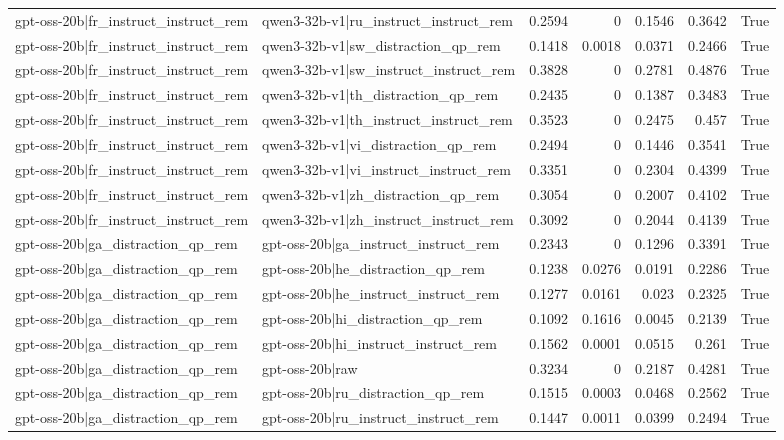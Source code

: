 \begin{table}
\begin{tabular}{l l r r r r l}
gpt-oss-20b|fr_instruct_instruct_rem & qwen3-32b-v1|ru_instruct_instruct_rem & 0.2594 & 0 & 0.1546 & 0.3642 & True \\
gpt-oss-20b|fr_instruct_instruct_rem & qwen3-32b-v1|sw_distraction_qp_rem & 0.1418 & 0.0018 & 0.0371 & 0.2466 & True \\
gpt-oss-20b|fr_instruct_instruct_rem & qwen3-32b-v1|sw_instruct_instruct_rem & 0.3828 & 0 & 0.2781 & 0.4876 & True \\
gpt-oss-20b|fr_instruct_instruct_rem & qwen3-32b-v1|th_distraction_qp_rem & 0.2435 & 0 & 0.1387 & 0.3483 & True \\
gpt-oss-20b|fr_instruct_instruct_rem & qwen3-32b-v1|th_instruct_instruct_rem & 0.3523 & 0 & 0.2475 & 0.457 & True \\
gpt-oss-20b|fr_instruct_instruct_rem & qwen3-32b-v1|vi_distraction_qp_rem & 0.2494 & 0 & 0.1446 & 0.3541 & True \\
gpt-oss-20b|fr_instruct_instruct_rem & qwen3-32b-v1|vi_instruct_instruct_rem & 0.3351 & 0 & 0.2304 & 0.4399 & True \\
gpt-oss-20b|fr_instruct_instruct_rem & qwen3-32b-v1|zh_distraction_qp_rem & 0.3054 & 0 & 0.2007 & 0.4102 & True \\
gpt-oss-20b|fr_instruct_instruct_rem & qwen3-32b-v1|zh_instruct_instruct_rem & 0.3092 & 0 & 0.2044 & 0.4139 & True \\
gpt-oss-20b|ga_distraction_qp_rem & gpt-oss-20b|ga_instruct_instruct_rem & 0.2343 & 0 & 0.1296 & 0.3391 & True \\
gpt-oss-20b|ga_distraction_qp_rem & gpt-oss-20b|he_distraction_qp_rem & 0.1238 & 0.0276 & 0.0191 & 0.2286 & True \\
gpt-oss-20b|ga_distraction_qp_rem & gpt-oss-20b|he_instruct_instruct_rem & 0.1277 & 0.0161 & 0.023 & 0.2325 & True \\
gpt-oss-20b|ga_distraction_qp_rem & gpt-oss-20b|hi_distraction_qp_rem & 0.1092 & 0.1616 & 0.0045 & 0.2139 & True \\
gpt-oss-20b|ga_distraction_qp_rem & gpt-oss-20b|hi_instruct_instruct_rem & 0.1562 & 0.0001 & 0.0515 & 0.261 & True \\
gpt-oss-20b|ga_distraction_qp_rem & gpt-oss-20b|raw & 0.3234 & 0 & 0.2187 & 0.4281 & True \\
gpt-oss-20b|ga_distraction_qp_rem & gpt-oss-20b|ru_distraction_qp_rem & 0.1515 & 0.0003 & 0.0468 & 0.2562 & True \\
gpt-oss-20b|ga_distraction_qp_rem & gpt-oss-20b|ru_instruct_instruct_rem & 0.1447 & 0.0011 & 0.0399 & 0.2494 & True \\

\end{tabular}
\end{table}
